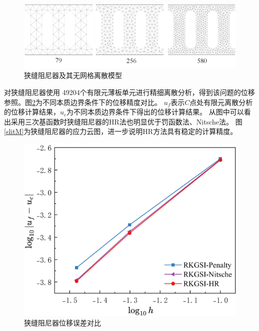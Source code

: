 \begin{figure}[H]
    \centering
    \includegraphics[scale=0.7]{figure/DAMPER/SLIT/slit damper_msh.png}
    \caption{狭缝阻尼器及其无网格离散模型}\label{slitmsh}
\end{figure}
对狭缝阻尼器使用 49204个有限元薄板单元进行精细离散分析，得到该问题的位移参照。图\ref{slitx}为不同本质边界条件下的位移精度对比。
$u_f$表示$C$点处有限元离散分析的位移计算结果，$u_c$为不同本质边界条件下得出的位移计算结果。
从图中可以看出采用三次基函数时狭缝阻尼器的HR法也明显优于罚函数法、Nitsche法。
图\ref{slitM}为狭缝阻尼器的应力云图，进一步说明HR方法具有稳定的计算精度。
\newpage
\begin{figure}[H]
    \centering
    \includegraphics[scale=0.45]{figure/DAMPER/SLIT/slit-x.png}
    \caption{狭缝阻尼器位移误差对比}\label{slitx}
\end{figure}
